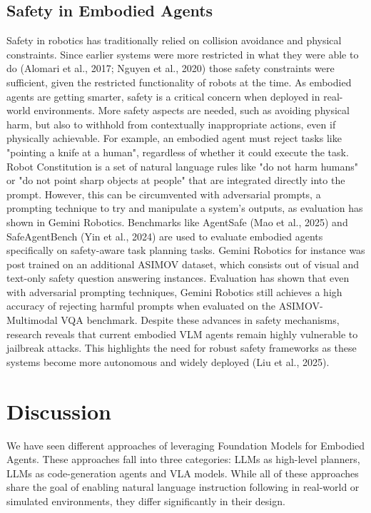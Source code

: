 \documentclass[11pt]{article}
\begin{document}
\subsection{Safety in Embodied Agents}
Safety in robotics has traditionally relied on collision avoidance and physical constraints. Since earlier systems were more restricted in what they were able to do (Alomari et al., 2017; Nguyen et al., 2020) those safety constraints were sufficient, given the restricted functionality of robots at the time.
As embodied agents are getting smarter, safety is a critical concern when deployed in real-world environments. More safety aspects are needed, such as avoiding physical harm, but also to withhold from contextually inappropriate actions, even if physically achievable. For example, an embodied agent must reject tasks like "pointing a knife at a human", regardless of whether it could execute the task.
Robot Constitution is a set of natural language rules like "do not harm humans" or "do not point sharp objects at people" that are integrated directly into the prompt. 
However, this can be circumvented with adversarial prompts, a prompting technique to try and manipulate a system's outputs, as evaluation has shown in Gemini Robotics.
Benchmarks like AgentSafe (Mao et al., 2025) and SafeAgentBench (Yin et al., 2024) are used to evaluate embodied agents specifically on safety-aware task planning tasks.
Gemini Robotics for instance was post trained on an additional ASIMOV dataset, which consists out of visual and text-only safety question answering instances. 
Evaluation has shown that even with adversarial prompting techniques, Gemini Robotics still achieves a high accuracy of rejecting harmful prompts when evaluated on the ASIMOV-Multimodal VQA benchmark.
\hfill \break \hfill \break
Despite these advances in safety mechanisms, research reveals that current embodied VLM agents remain highly vulnerable to jailbreak attacks. This highlights the need for robust safety frameworks as these systems become more autonomous and widely deployed (Liu et al., 2025).

\section{Discussion}
We have seen different approaches of leveraging Foundation Models for Embodied Agents. These approaches fall into three categories: LLMs as high-level planners, LLMs as code-generation agents and VLA models. While all of these approaches share the goal of enabling natural language instruction following in real-world or simulated environments, they differ significantly in their design.
\end{document}
